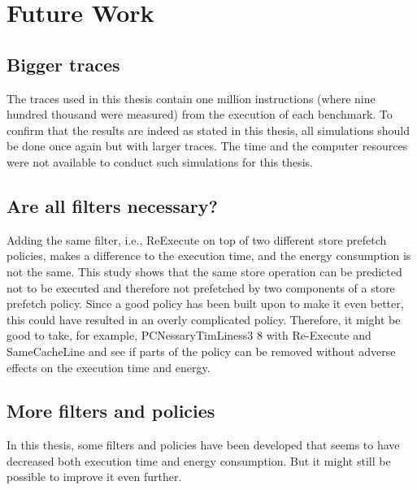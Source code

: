 \chapter{Future Work}
\label{chap:fetueredWork}

\section{Bigger traces}
The traces used in this thesis contain one million instructions (where nine hundred
thousand were measured) from the execution of each benchmark. To confirm that the
results are indeed as stated in this thesis, all simulations should be done once again
but with larger traces. The time and the computer resources were not available to
conduct such simulations for this thesis.
\section{Are all filters necessary?}
Adding the same filter, i.e., ReExecute on top of two different store prefetch policies, makes a difference to the
execution time, and the energy consumption is not the same. This study shows
that the same store operation can be predicted not to be executed and therefore
not prefetched by two components of a store prefetch policy. Since a good policy
has been built upon to make it even better, this could have resulted in an overly
complicated policy. Therefore, it might be good to take, for example, PCNessaryTimLiness3 8
with Re-Execute and SameCacheLine and see if parts of the policy can be removed
without adverse effects on the execution time and energy.
\section{More filters and policies}
In this thesis, some filters and policies have been developed that seems to have decreased both execution time and energy consumption. But it might still be possible to improve it even further.
